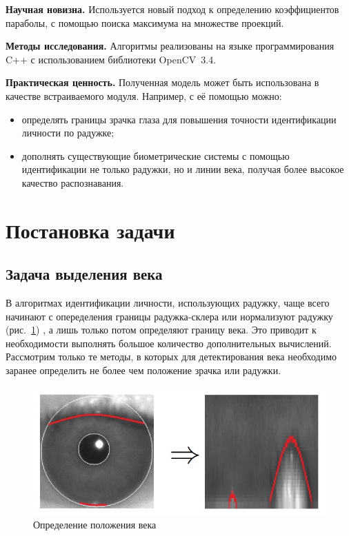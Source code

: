 \documentclass[12pt]{article} %
\begin{document}
\bigskip

\textbf{Научная новизна.} Используется новый подход к определению коэффициентов параболы, с помощью поиска максимума на множестве проекций.

\bigskip

\textbf{Методы исследования.} Алгоритмы реализованы на языке программирования C++ с использованием библиотеки OpenCV~3.4.

\bigskip

\textbf{Практическая ценность.} Полученная модель может быть использована в качестве встраиваемого модуля. Например, с её помощью можно:
\begin{itemize}
	\item определять границы зрачка глаза для повышения точности идентификации личности по радужке;
	\item дополнять существующие биометрические системы с помощью идентификации не только радужки, но и линии века, получая более высокое качество распознавания.
\end{itemize}


\newpage
\section{Постановка задачи}


\subsection{Задача выделения века}
В алгоритмах идентификации личности, использующих радужку, чаще всего начинают с опеределения границы радужка-склера \cite{Adam_1, Daugman, Matv} или нормализуют радужку (рис.~\ref{fig:glaz3}) \cite{Min}, а лишь только потом определяют границу века. Это приводит к необходимости выполнять большое количество дополнительных вычислений. Рассмотрим только те методы, в которых для детектирования века необходимо заранее определить не более чем положение зрачка или радужки.

\begin{figure}[h]
	
	\centering
	
	\includegraphics[width=0.8\linewidth]{glaz3.jpg}
	
	\caption{Определение положения века}
	
	\label{fig:glaz3}
	
\end{figure}
\end{document}
